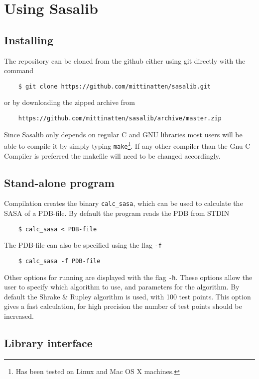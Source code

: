 \documentclass[a4paper,11pt]{article}
\begin{document}
\section{Using Sasalib}

\subsection{Installing}

The repository can be cloned from the github either using git
directly with the command
\begin{verbatim}
    $ git clone https://github.com/mittinatten/sasalib.git
\end{verbatim}
or by downloading the zipped archive from
\begin{verbatim}
    https://github.com/mittinatten/sasalib/archive/master.zip
\end{verbatim}
Since Sasalib only depends on regular C and GNU libraries most users
will be able to compile it by simply typing \texttt{make}\footnote{Has
  been tested on Linux and Mac OS X machines.}. If any other compiler
than the Gnu C Compiler is preferred the makefile will need to be
changed accordingly.

\subsection{Stand-alone program}

Compilation creates the binary \texttt{calc\_sasa}, which can be used
to calculate the SASA of a PDB-file. By default the program reads the
PDB from STDIN
\begin{verbatim} 
    $ calc_sasa < PDB-file    
\end{verbatim}
The PDB-file can also be specified using the flag \texttt{-f}
\begin{verbatim}
    $ calc_sasa -f PDB-file
\end{verbatim}
Other options for running are displayed with the flag
\texttt{-h}. These options allow the user to specify which algorithm
to use, and parameters for the algorithm. By default the Shrake \&
Rupley algorithm is used, with 100 test points. This option gives a
fast calculation, for high precision the number of test points should
be increased.
 
\subsection{Library interface}
\end{document}
